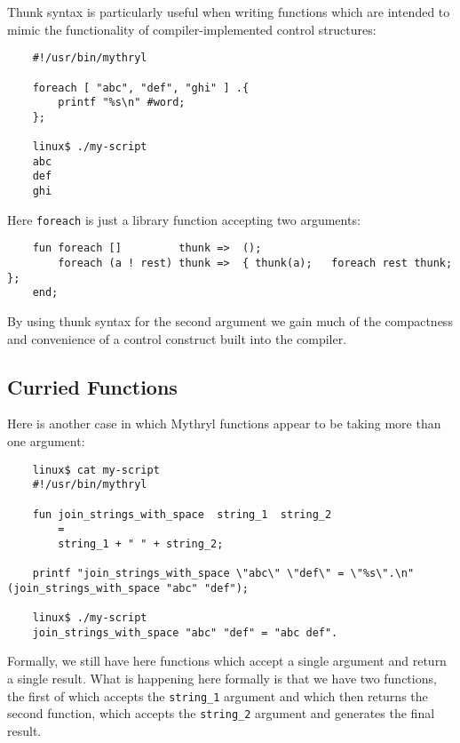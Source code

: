 Thunk syntax is particularly useful when writing functions which 
are intended to mimic the functionality of compiler-implemented 
control structures:

\begin{verbatim}
    #!/usr/bin/mythryl

    foreach [ "abc", "def", "ghi" ] .{
        printf "%s\n" #word;
    };

    linux$ ./my-script
    abc
    def
    ghi
\end{verbatim}

Here {\tt foreach} is just a library function accepting two 
arguments:

\begin{verbatim}
    fun foreach []         thunk =>  ();
        foreach (a ! rest) thunk =>  { thunk(a);   foreach rest thunk; };
    end;
\end{verbatim}

By using thunk syntax for the second argument we gain much of the compactness 
and convenience of a control construct built into the compiler.

\cutend*



\subsection{Curried Functions}
\label{section:ref:functions:curried-functions}

Here is another case in which Mythryl functions appear to be taking 
more than one argument:

\begin{verbatim}
    linux$ cat my-script
    #!/usr/bin/mythryl

    fun join_strings_with_space  string_1  string_2
        =
        string_1 + " " + string_2;

    printf "join_strings_with_space \"abc\" \"def\" = \"%s\".\n" (join_strings_with_space "abc" "def");

    linux$ ./my-script
    join_strings_with_space "abc" "def" = "abc def".
\end{verbatim}

Formally, we still have here functions which accept a single 
argument and return a single result.  What is happening here 
formally is that we have two functions, the first of which 
accepts the {\tt string\_1} argument and which then returns 
the second function, which accepts the {\tt string\_2} argument 
and generates the final result.

